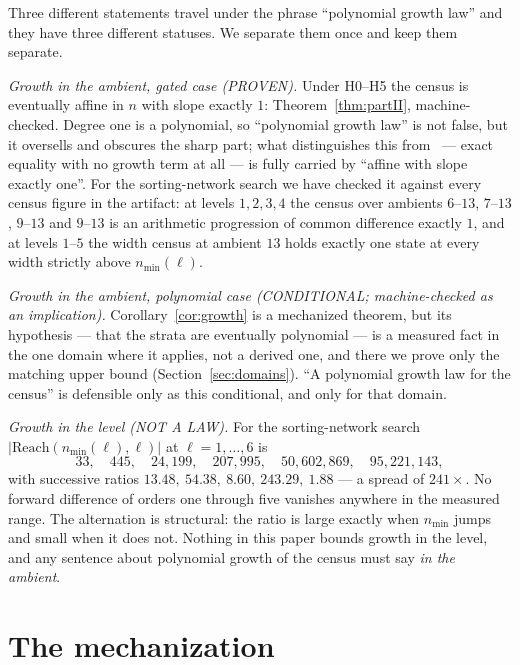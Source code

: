 \documentclass[11pt,a4paper]{article}
\theoremstyle{plain}
\theoremstyle{definition}
\theoremstyle{remark}
\newcommand{\Reach}{\mathrm{Reach}}
\newcommand{\nmin}{n_{\min}}
\begin{document}
Three different statements travel under the phrase ``polynomial growth law''
and they have three different statuses. We separate them once and keep them
separate.

\emph{Growth in the ambient, gated case (PROVEN).} Under H0--H5 the census is
eventually affine in $n$ with slope exactly $1$: Theorem~\ref{thm:partII},
machine-checked. Degree one is a polynomial, so ``polynomial growth law'' is not
false, but it oversells and obscures the sharp part; what distinguishes this
from~\cite{KKW10} --- exact equality with no growth term at all --- is fully
carried by ``affine with slope exactly one''. For the sorting-network search we
have checked it against every census figure in the artifact: at levels
$1,2,3,4$ the census over ambients $6$--$13$, $7$--$13$, $9$--$13$ and
$9$--$13$ is an arithmetic progression of common difference exactly $1$, and at
levels $1$--$5$ the width census at ambient $13$ holds exactly one state at
every width strictly above $\nmin(\ell)$.

\emph{Growth in the ambient, polynomial case (CONDITIONAL; machine-checked as
an implication).} Corollary~\ref{cor:growth} is a mechanized theorem, but its
hypothesis --- that the strata are eventually polynomial --- is a measured fact
in the one domain where it applies, not a derived one, and there we prove only
the matching upper bound (Section~\ref{sec:domains}). ``A polynomial growth law
for the census'' is defensible only as this conditional, and only for that
domain.

\emph{Growth in the level (NOT A LAW).} For the sorting-network search
$|\Reach(\nmin(\ell),\ell)|$ at $\ell = 1,\dots,6$ is
\[
33,\quad 445,\quad 24{,}199,\quad 207{,}995,\quad 50{,}602{,}869,\quad
95{,}221{,}143,
\]
with successive ratios $13.48,\ 54.38,\ 8.60,\ 243.29,\ 1.88$ --- a spread of
$241\times$. No forward difference of orders one through five vanishes anywhere
in the measured range. The alternation is structural: the ratio is large
exactly when $\nmin$ jumps and small when it does not. Nothing in this paper
bounds growth in the level, and any sentence about polynomial growth of the
census must say \emph{in the ambient}.

\section{The mechanization}\label{sec:mech}
\end{document}
